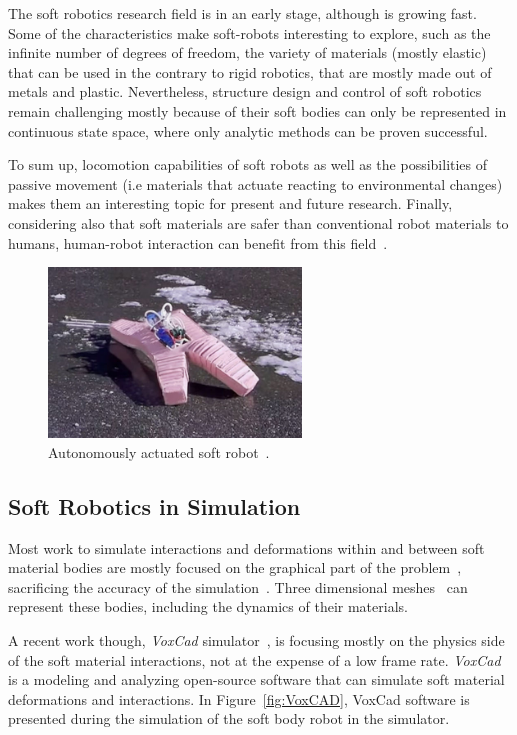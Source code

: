 The soft robotics research field is in an early stage, although is growing fast. Some of the characteristics make soft-robots interesting to explore, such as the infinite number of degrees of freedom, the variety of materials (mostly elastic) that can be used in the contrary to rigid robotics, that are mostly made out of metals and plastic. Nevertheless, structure design and control of soft robotics remain challenging mostly because of their soft bodies can only be represented in continuous state space, where only analytic methods can be proven successful.

To sum up, locomotion capabilities of soft robots as well as the possibilities of passive movement (i.e materials that actuate reacting to environmental changes) makes them an interesting topic for present and future research. Finally, considering also that soft materials are safer than conventional robot materials to humans, human-robot interaction can benefit from this field~\citep{sanan2011continuum}.


\begin{figure}[t!]
\centering
\includegraphics[width=0.6\textwidth]{../Figures/Misc/softbot.jpg}
\caption{Autonomously actuated soft robot~\citep{tolleyresilient}.}
\label{fig:softbot}
\end{figure}


\subsection{Soft Robotics in Simulation}

Most work to simulate interactions and deformations within and between soft material bodies are mostly focused on the graphical part of the problem~\citep{faloutsos1997dynamic}, sacrificing the accuracy of the simulation~\citep{teschner2004versatile}. Three dimensional meshes~\citep{muller2002stable} can represent these bodies, including the dynamics of their materials. 

A recent work though, \emph{VoxCad} simulator~\citep{hiller2012dynamic}, is focusing mostly on the physics side of the soft material interactions, not at the expense of a low frame rate. \emph{VoxCad} is a modeling and analyzing open-source software that can simulate soft material deformations and interactions. In Figure~\ref{fig:VoxCAD}, VoxCad software is presented during the simulation of the soft body robot in the simulator.

